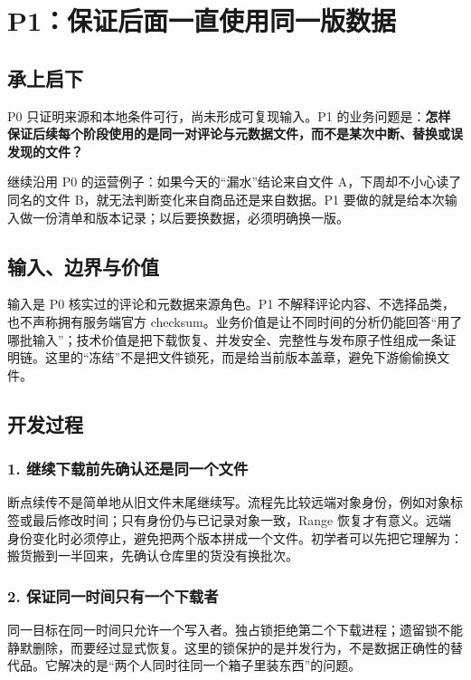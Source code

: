 \chapter{P1：保证后面一直使用同一版数据}

\section{承上启下}

P0 只证明来源和本地条件可行，尚未形成可复现输入。P1 的业务问题是：\textbf{怎样保证后续每个阶段使用的是同一对评论与元数据文件，而不是某次中断、替换或误发现的文件？}

\begin{beginnerbox}
继续沿用 P0 的运营例子：如果今天的“漏水”结论来自文件 A，下周却不小心读了同名的文件 B，就无法判断变化来自商品还是来自数据。P1 要做的就是给本次输入做一份清单和版本记录；以后要换数据，必须明确换一版。
\end{beginnerbox}

\section{输入、边界与价值}

输入是 P0 核实过的评论和元数据来源角色。P1 不解释评论内容、不选择品类，也不声称拥有服务端官方 checksum。业务价值是让不同时间的分析仍能回答“用了哪批输入”；技术价值是把下载恢复、并发安全、完整性与发布原子性组成一条证明链。这里的“冻结”不是把文件锁死，而是给当前版本盖章，避免下游偷偷换文件。

\section{开发过程}

\subsection{1. 继续下载前先确认还是同一个文件}

断点续传不是简单地从旧文件末尾继续写。流程先比较远端对象身份，例如对象标签或最后修改时间；只有身份仍与已记录对象一致，Range 恢复才有意义。远端身份变化时必须停止，避免把两个版本拼成一个文件。初学者可以先把它理解为：搬货搬到一半回来，先确认仓库里的货没有换批次。

\subsection{2. 保证同一时间只有一个下载者}

同一目标在同一时间只允许一个写入者。独占锁拒绝第二个下载进程；遗留锁不能静默删除，而要经过显式恢复。这里的锁保护的是并发行为，不是数据正确性的替代品。它解决的是“两个人同时往同一个箱子里装东西”的问题。

